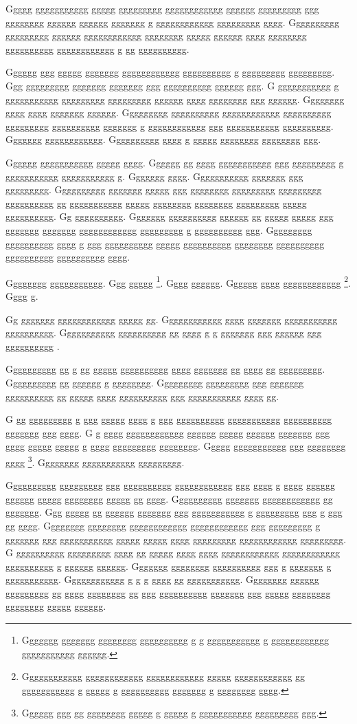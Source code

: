 \documentclass[conference]{IEEEtran}
\begin{document}
Ggggg ggggggggggg ggggg ggggggggg gggggggggggg gggggg ggggggggg ggg gggggggg gggggg gggggg ggggggg g gggggggggggg ggggggggg gggg.  Gggggggggg ggggggggg gggggg gggggggggggg gggggggg ggggg gggggg gggg gggggggg gggggggggg gggggggggggg g gg gggggggggg.

Gggggg ggg ggggg ggggggg gggggggggggg gggggggggg g ggggggggg ggggggggg.  Ggg ggggggggg ggggggg ggggggg ggg gggggggggg gggggg ggg.  G ggggggggggg g ggggggggggg ggggggggg ggggggggg gggggg gggg gggggggg ggg gggggg.  Gggggggg gggg gggg ggggggg gggggg.  Ggggggggg gggggggggg gggggggggggg gggggggggg ggggggggg gggggggggg ggggggg g gggggggggggg ggg ggggggggggg gggggggggg.  Ggggggg gggggggggggg.  Gggggggggg gggg g ggggg gggggggg gggggggg ggg.

Gggggg ggggggggggg ggggg gggg.  Gggggg gg gggg ggggggggggg ggg ggggggggg g ggggggggggg ggggggggggg g.  Ggggggg gggg.  Ggggggggggg ggggggg ggg ggggggggg.  Gggggggggg ggggggg ggggg ggg gggggggg ggggggggg ggggggggg gggggggggg gg ggggggggggg ggggg gggggggg gggggggg ggggggggg ggggg gggggggggg.  Gg gggggggggg.  Ggggggg gggggggggg gggggg gg ggggg ggggg ggg ggggggg ggggggg gggggggggggg ggggggggg g gggggggggg ggg.  Ggggggggg gggggggggg gggg g ggg gggggggggg ggggg gggggggggg gggggggg gggggggggg gggggggggg gggggggggg gggg.

Gggggggg ggggggggggg.  Ggg ggggg \footnote{Ggggggg ggggggg gggggggg gggggggggg g g ggggggggggg g gggggggggggg ggggggggggg gggggg.}.  Gggg gggggg.  Gggggg gggg gggggggggggg \footnote{Gggggggggggg gggggggggggg gggggggggggg ggggg gggggggggggg gg ggggggggggg g ggggg g gggggggggg ggggggg g gggggggg gggg.}.  Gggg g.

Gg ggggggg gggggggggggg ggggg gg.  Gggggggggggg gggg ggggggg ggggggggggg gggggggggg.  Ggggggggggg gggggggggg gg gggg g g ggggggg ggg gggggg ggg gggggggggg \cite{g16}.

Gggggggggg gg g gg ggggg gggggggggg gggg ggggggg gg gggg gg ggggggggg.  Gggggggggg gg gggggg g gggggggg.  Ggggggggg ggggggggg ggg ggggggg gggggggggg gg ggggg gggg gggggggggg ggg ggggggggggg gggg gg.

G gg ggggggggg g ggg ggggg gggg g ggg gggggggggg ggggggggggg gggggggggg ggggggg ggg gggg.  G g gggg gggggggggggg gggggg ggggg gggggg ggggggg ggg gggg ggggg ggggg g gggg ggggggggg gggggggg.  Ggggg ggggggggggg ggg gggggggg gggg \footnote{Gggggg ggg gg gggggggg ggggg g ggggg g ggggggggggg ggggggggg ggg.}.  Gggggggg ggggggggggg ggggggggg.

Gggggggggg ggggggggg ggg gggggggggg gggggggggggg ggg gggg g gggg gggggg gggggg ggggg gggggggg ggggg gg gggg.  Gggggggggg ggggggg gggggggggggg gg ggggggg.  Ggg ggggg gg gggggg ggggggg ggg ggggggggggg g ggggggggg ggg g ggg gg gggg.  Gggggggg gggggggg gggggggggggg gggggggggggg ggg ggggggggg g ggggggg ggg ggggggggggg ggggg ggggg gggg ggggggggg gggggggggggg ggggggggg.  G gggggggggg ggggggggg gggg gg ggggg gggg gggg gggggggggggg gggggggggggg gggggggggg g gggggg gggggg.  Ggggggg gggggggg gggggggggg ggg g ggggggg g ggggggggggg.  Gggggggggggg g g g gggg gg ggggggggggg.  Gggggggg gggggg ggggggggg gg gggg gggggggg gg ggg gggggggggg ggggggg ggg ggggg gggggggg gggggggg ggggg gggggg.
\end{document}
